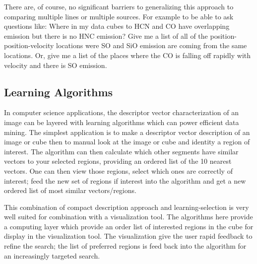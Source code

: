 There are, of course, no significant barriers to generalizing this approach to
comparing multiple lines or multiple sources. For example to be able to ask questions
like: Where in my data cubes to HCN and CO have overlapping emission but there
is no HNC emission? Give me a list of all of the position-position-velocity locations
were SO and SiO emission are coming from the same locations. Or, give me a list
of the places where the CO is falling off rapidly with velocity and there is
SO emission.

\subsection{Learning Algorithms}

In computer science applications, the descriptor vector characterization of an image
can be layered with learning algorithms which can power efficient data mining. The
simplest application is to make a descriptor vector description of an image or
cube then to manual look at the image or cube and identity a region of interest.
The algorithm can then calculate which other segments have similar vectors to your
selected regions, providing an ordered list of the 10 nearest vectors. One can
then view those regions, select which ones are correctly of interest; feed the
new set of regions if interest into the algorithm and get a new ordered list of
most similar vectors/regions. 

This combination of compact description approach and learning-selection is very
well suited for combination with a visualization tool. The algorithms here 
provide a computing layer which provide an order list of interested regions in the
cube for display in the visualization tool. The visualization give the user
rapid feedback to refine the search; the list of preferred regions is feed back
into the algorithm for an increasingly targeted search.
